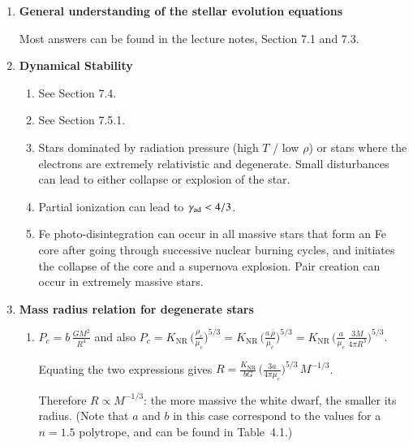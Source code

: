 \documentclass[11pt,a4paper,fleqn]{report}
\begin{document}

\begin{enumerate}


\item {\bf General understanding of the stellar evolution equations} 

  Most answers can be found in the lecture notes, Section 7.1 and 7.3.



\item {\bf Dynamical Stability} 

  \begin{enumerate}

  \item See Section 7.4.
    
  \item See Section 7.5.1.
    
  \item Stars dominated by radiation pressure (high $T$ / low $\rho$)
    or stars where the electrons are extremely relativistic and
    degenerate. Small disturbances can lead to either collapse or
    explosion of the star.
    
  \item Partial ionization can lead to $\gamma_{\rm ad} < 4/3$.
   
  \item Fe photo-disintegration can occur in all massive stars that
    form an Fe core after going through successive nuclear burning
    cycles, and initiates the collapse of the core and a supernova
    explosion. Pair creation can occur in extremely massive stars.

  \end{enumerate}


\item {\bf Mass radius relation for degenerate stars}
  \begin{enumerate}

  \item $\displaystyle P_c = b\, \frac{G M^2}{R^4}$ \quad and also
    \quad $\displaystyle P_c = K_\mathrm{NR}\,
    \Bigg(\frac{\rho_c}{\mu_e}\Bigg)^{5/3} = K_\mathrm{NR}\,
    \Bigg(\frac{a\,\bar{\rho}}{\mu_e}\Bigg)^{5/3} = K_\mathrm{NR}\,
    \Bigg(\frac{a}{\mu_e}\,\frac{3 M}{4\pi R^3}\Bigg)^{5/3} $.

    Equating the two expressions gives \quad $\displaystyle R =
    \frac{K_\mathrm{NR}}{b G}\, \Bigg( \frac{3a}{4\pi\mu_e}
    \Bigg)^{5/3}\, M^{-1/3}$. 

    Therefore $R \propto M^{-1/3}$: the more massive the white dwarf,
    the smaller its radius.  (Note that $a$ and $b$ in this case
    correspond to the values for a $n=1.5$ polytrope, and can be found
    in Table~4.1.)


\end{enumerate}
\end{enumerate}
\end{document}
